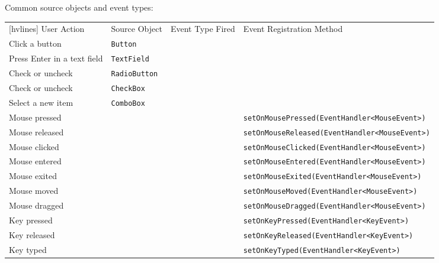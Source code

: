 \documentclass{article}
\begin{document}
Common source objects and event types:
\begin{table}[h]
	\centering
	\begin{NiceTabular}{||X|l|l|l||}[hvlines]
		\RowStyle{\bfseries} User Action & Source Object & Event Type Fired & Event Registration Method\\
		Click a button & \texttt{Button} &  & \\
		Press Enter in a text field & \texttt{TextField} & &\\
		Check or uncheck & \texttt{RadioButton} & &\\
		Check or uncheck & \texttt{CheckBox} & &\\
		Select a new item & \texttt{ComboBox} & &\\
		Mouse pressed &  &  & \texttt{setOnMousePressed(EventHandler<MouseEvent>)}\\
		Mouse released & & & \texttt{setOnMouseReleased(EventHandler<MouseEvent>)}\\
		Mouse clicked & & & \texttt{setOnMouseClicked(EventHandler<MouseEvent>)}\\
		Mouse entered & & & \texttt{setOnMouseEntered(EventHandler<MouseEvent>)}\\
		Mouse exited & & & \texttt{setOnMouseExited(EventHandler<MouseEvent>)}\\
		Mouse moved & & & \texttt{setOnMouseMoved(EventHandler<MouseEvent>)}\\
		Mouse dragged & & & \texttt{setOnMouseDragged(EventHandler<MouseEvent>)}\\
		Key pressed &  &  & \texttt{setOnKeyPressed(EventHandler<KeyEvent>)}\\
		Key released & & & \texttt{setOnKeyReleased(EventHandler<KeyEvent>)}\\
		Key typed & & & \texttt{setOnKeyTyped(EventHandler<KeyEvent>)}
	\end{NiceTabular}
\end{table}

\newpage
\end{document}
